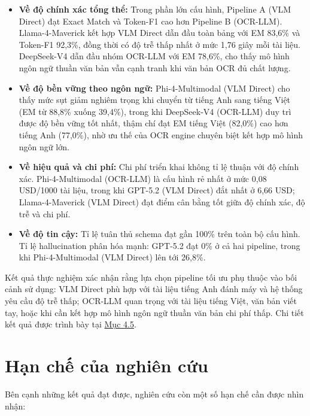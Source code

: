 ﻿\documentclass[12pt]{report}
\begin{document}
\begin{itemize}
    \item \textbf{Về độ chính xác tổng thể:} Trong phần lớn cấu hình, Pipeline A (VLM Direct) đạt Exact Match và Token-F1 cao hơn Pipeline B (OCR-LLM). Llama-4-Maverick kết hợp VLM Direct dẫn đầu toàn bảng với EM 83,6\% và Token-F1 92,3\%, đồng thời có độ trễ thấp nhất ở mức 1,76 giây mỗi tài liệu. DeepSeek-V4 dẫn đầu nhóm OCR-LLM với EM 78,6\%, cho thấy mô hình ngôn ngữ thuần văn bản vẫn cạnh tranh khi văn bản OCR đủ chất lượng.

    \item \textbf{Về độ bền vững theo ngôn ngữ:} Phi-4-Multimodal (VLM Direct) cho thấy mức sụt giảm nghiêm trọng khi chuyển từ tiếng Anh sang tiếng Việt (EM từ 88,8\% xuống 39,4\%), trong khi DeepSeek-V4 (OCR-LLM) duy trì được độ bền vững tốt nhất, thậm chí đạt EM tiếng Việt (82,0\%) cao hơn tiếng Anh (77,0\%), nhờ ưu thế của OCR engine chuyên biệt kết hợp mô hình ngôn ngữ lớn.

    \item \textbf{Về hiệu quả và chi phí:} Chi phí triển khai không tỉ lệ thuận với độ chính xác. Phi-4-Multimodal (OCR-LLM) là cấu hình rẻ nhất ở mức 0,08 USD/1000 tài liệu, trong khi GPT-5.2 (VLM Direct) đắt nhất ở 6,66 USD; Llama-4-Maverick (VLM Direct) đạt điểm cân bằng tốt giữa độ chính xác, độ trễ và chi phí.

    \item \textbf{Về độ tin cậy:} Tỉ lệ tuân thủ schema đạt gần 100\% trên toàn bộ cấu hình. Tỉ lệ hallucination phân hóa mạnh: GPT-5.2 đạt 0\% ở cả hai pipeline, trong khi Phi-4-Multimodal (VLM Direct) lên tới 26,8\%.
\end{itemize}

Kết quả thực nghiệm xác nhận rằng lựa chọn pipeline tối ưu phụ thuộc vào bối cảnh sử dụng: VLM Direct phù hợp với tài liệu tiếng Anh đánh máy và hệ thống yêu cầu độ trễ thấp; OCR-LLM quan trọng với tài liệu tiếng Việt, văn bản viết tay, hoặc khi cần kết hợp mô hình ngôn ngữ thuần văn bản chi phí thấp. Chi tiết kết quả được trình bày tại \hyperref[sec:results]{Mục 4.5}.

\section{Hạn chế của nghiên cứu}\label{sec:limitations}

Bên cạnh những kết quả đạt được, nghiên cứu còn một số hạn chế cần được nhìn nhận:
\end{document}
